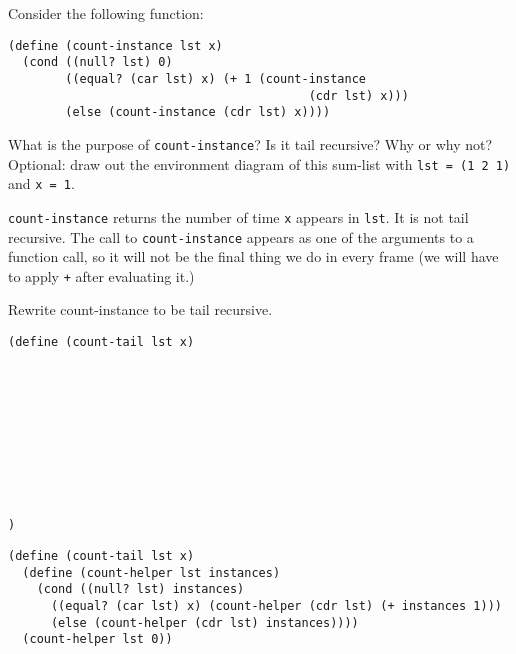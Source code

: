 \begin{blocksection}
\question Consider the following function:

\begin{lstlisting}
(define (count-instance lst x)
  (cond ((null? lst) 0)
        ((equal? (car lst) x) (+ 1 (count-instance 
                                          (cdr lst) x)))
        (else (count-instance (cdr lst) x))))
\end{lstlisting}

\vspace{2\baselineskip}

What is the purpose of \texttt{count-instance}? Is it tail recursive? Why or why not?
\newline
Optional: draw out the environment diagram of this sum-list with \texttt{lst = (1 2 1)} and \texttt{x = 1}.

\begin{solution}[0.5in]
\texttt{count-instance} returns the number of time \texttt{x} appears in \texttt{lst}. It is not tail recursive. The call to \texttt{count-instance} appears as one of the arguments to a function call, so it will not be the final thing we do in every frame (we will have to apply \texttt{+} after evaluating it.)
\end{solution}


\question Rewrite count-instance to be tail recursive.

\begin{lstlisting}
(define (count-tail lst x)










)
\end{lstlisting}

\begin{solution}[0.5in]
\begin{lstlisting}
(define (count-tail lst x)
  (define (count-helper lst instances)
    (cond ((null? lst) instances)
      ((equal? (car lst) x) (count-helper (cdr lst) (+ instances 1)))
      (else (count-helper (cdr lst) instances))))
  (count-helper lst 0))
\end{lstlisting}
\end{solution}
\end{blocksection}

